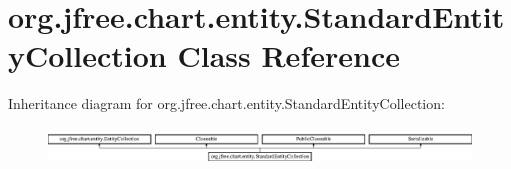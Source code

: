\hypertarget{classorg_1_1jfree_1_1chart_1_1entity_1_1_standard_entity_collection}{}\section{org.\+jfree.\+chart.\+entity.\+Standard\+Entity\+Collection Class Reference}
\label{classorg_1_1jfree_1_1chart_1_1entity_1_1_standard_entity_collection}
Inheritance diagram for org.\+jfree.\+chart.\+entity.\+Standard\+Entity\+Collection\+:\begin{figure}[H]
\begin{center}
\leavevmode
\includegraphics[height=1.007194cm]{classorg_1_1jfree_1_1chart_1_1entity_1_1_standard_entity_collection}
\end{center}
\end{figure}

